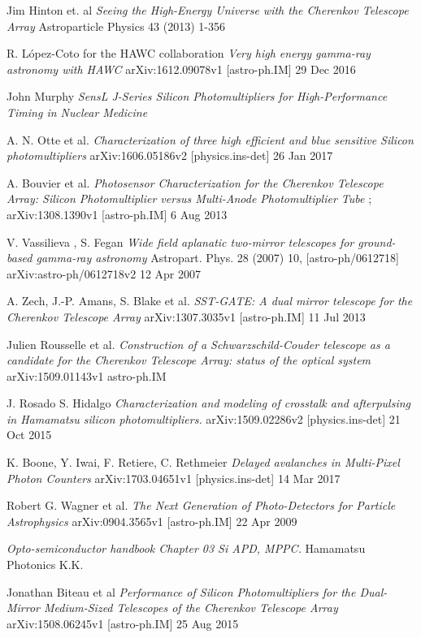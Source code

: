 \documentclass[12pt,article,type=msc,colorback,accentcolor=tud9c]{tudthesis}
\begin{document}
{\begin{thebibliography}{12}
 Jim Hinton et. al \textit{Seeing the High-Energy Universe with the Cherenkov Telescope Array} Astroparticle Physics 43 (2013) 1-356 

 R. L\'opez-Coto for the HAWC collaboration \textit{Very high energy gamma-ray astronomy with HAWC} arXiv:1612.09078v1 [astro-ph.IM] 29 Dec 2016

 John Murphy \textit{SensL J-Series Silicon Photomultipliers for High-Performance Timing in Nuclear Medicine}

 A. N. Otte et al. \textit{Characterization of three high efficient and blue sensitive Silicon photomultipliers} arXiv:1606.05186v2 [physics.ins-det] 26 Jan 2017

  A. Bouvier et al. \textit{Photosensor Characterization for the Cherenkov Telescope Array: Silicon Photomultiplier versus Multi-Anode Photomultiplier Tube} ; arXiv:1308.1390v1 [astro-ph.IM] 6 Aug 2013

 V. Vassilieva , S. Fegan \textit{Wide field aplanatic two-mirror telescopes for ground-based gamma-ray astronomy} Astropart. Phys. 28 (2007) 10, [astro-ph/0612718] arXiv:astro-ph/0612718v2 12 Apr 2007

 A. Zech, J.-P. Amans, S. Blake et al. \textit{SST-GATE: A dual mirror telescope for the Cherenkov Telescope Array} arXiv:1307.3035v1 [astro-ph.IM] 11 Jul 2013

 Julien Rousselle et al. \textit{Construction of a Schwarzschild-Couder telescope as a candidate for the Cherenkov Telescope Array: status of the optical system}  arXiv:1509.01143v1 astro-ph.IM

 J. Rosado S. Hidalgo \textit{Characterization and modeling of crosstalk and afterpulsing in Hamamatsu silicon photomultipliers.} arXiv:1509.02286v2 [physics.ins-det] 21 Oct 2015

 K. Boone, Y. Iwai, F. Retiere, C. Rethmeier \textit{Delayed avalanches in Multi-Pixel Photon Counters} arXiv:1703.04651v1 [physics.ins-det] 14 Mar 2017

 Robert G. Wagner et al. \textit{The Next Generation of Photo-Detectors for Particle Astrophysics} arXiv:0904.3565v1 [astro-ph.IM] 22 Apr 2009

 \textit{Opto-semiconductor handbook Chapter 03 Si APD, MPPC.} Hamamatsu Photonics K.K.

 Jonathan Biteau et al \textit{Performance of Silicon Photomultipliers for the Dual-Mirror Medium-Sized Telescopes of the Cherenkov Telescope Array} arXiv:1508.06245v1 [astro-ph.IM] 25 Aug 2015


\end{thebibliography}}
\end{document}
